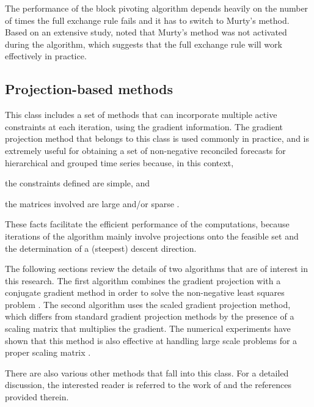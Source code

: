 \documentclass[11pt]{article}
\newcommand{\0}{\phantom{0}}
\begin{document}
The performance of the block pivoting algorithm depends heavily on the number of times the full exchange rule fails and it has to switch to Murty's method. Based on an extensive study, \citet{Kim2011} noted that Murty's method was not activated during the algorithm, which suggests that the full exchange rule will work effectively in practice. 


\subsection{Projection-based methods}
This class includes a set of methods that can incorporate multiple active constraints at each iteration, using the gradient information. The gradient projection method that belongs to this class is used commonly in practice, and is extremely useful for obtaining a set of non-negative reconciled forecasts for hierarchical and grouped time series because, in this context, \begin{inparaenum}[(i)] \item the constraints defined are simple, and \item the matrices involved are large and/or sparse \citep{Nocedal2006}. \end{inparaenum} These facts facilitate the efficient performance of the computations, because iterations of the algorithm mainly involve projections onto the feasible set and the determination of a (steepest) descent direction. 

The following sections review the details of two algorithms that are of interest in this research. The first algorithm combines the gradient projection with a conjugate gradient method in order to solve the non-negative least squares problem \citep{Nocedal2006}. The second algorithm uses the scaled gradient projection method, which differs from standard gradient projection methods by the presence of a scaling matrix that multiplies the gradient. The numerical experiments have shown that this method is also effective at handling large scale problems for a proper scaling matrix \citep{Bonettini2009}. 

There are also various other methods that fall into this class. For a detailed discussion, the interested reader is referred to the work of \citet{Chen2009} and the references provided therein.
\end{document}

